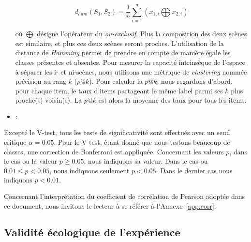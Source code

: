 \begin{itemize}
\begin{equation*}
d_{ham}(S_1,S_2)=\dfrac{1}{n}\sum_{i=1}^{n} (x_{1,i} \bigoplus x_{2,i})
\end{equation*}

où $\bigoplus$ désigne l'opérateur du \emph{ou-exclusif}. Plus la composition des deux scènes est similaire, et plus ces deux scènes seront proches. L'utilisation de la distance de \emph{Hamming} permet de prendre en compte de manière égale les classes présentes et absentes. Pour mesurer la capacité intrinsèque de l'espace à séparer les i- et ni-scènes, nous utilisons une métrique de \emph{clustering} nommée précision au rang $k$ ($p@k$). Pour calculer la $p@k$, nous regardons d'abord, pour chaque item, le taux d'items  partageant le même label parmi ses $k$ plus proche(s) voisin(s). La $p@k$ est alors la moyenne des taux pour tous les items.

\item {} :  
\end{itemize}

Excepté le V-test, tous les tests de significativité sont effectués avec un seuil critique $\alpha=0.05$. Pour le V-test, étant donné que nous testons beaucoup de classes, une correction de Bonferroni  est appliquée. Concernant les valeurs $p$, dans le cas ou la valeur $p\geq0.05$, nous indiquons sa valeur. Dans le cas ou $0.01\leq p<0.05$, nous indiquons seulement $p<0.05$. Dans le dernier cas nous indiquons $p<0.01$.

Concernant l'interprétation du coefficient de corrélation de Pearson adoptée dans ce document, nous invitons le lecteur à se référer à l'Annexe~\ref{app:corr}.

\subsection{Validité écologique de l'expérience}

